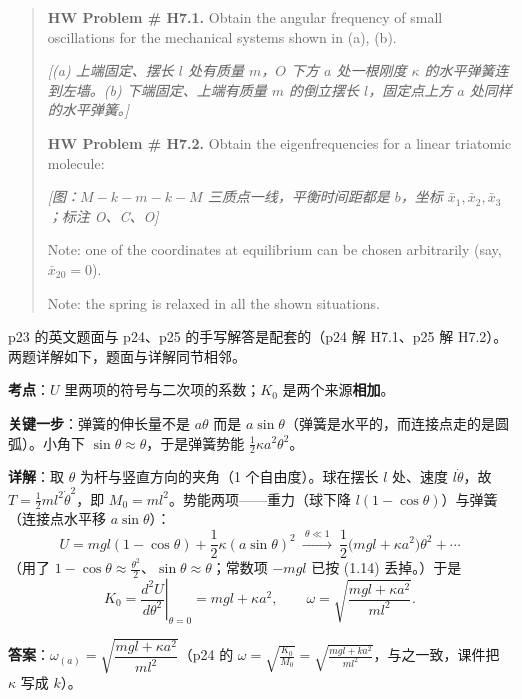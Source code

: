 \documentclass[11pt]{ctexart}
\begin{document}


\begin{quote}
\small
\textbf{HW Problem \# H7.1.} Obtain the angular frequency of small oscillations for the mechanical systems shown in (a), (b).

\emph{[(a) 上端固定、摆长 $l$ 处有质量 $m$，$O$ 下方 $a$ 处一根刚度 $\kappa$ 的水平弹簧连到左墙。(b) 下端固定、上端有质量 $m$ 的倒立摆长 $l$，固定点上方 $a$ 处同样的水平弹簧。]}

\textbf{HW Problem \# H7.2.} Obtain the eigenfrequencies for a linear triatomic molecule:

\emph{[图：$M\!-\!k\!-\!m\!-\!k\!-\!M$ 三质点一线，平衡时间距都是 $b$，坐标 $\bar x_1,\bar x_2,\bar x_3$；标注 O、C、O]}

Note: one of the coordinates at equilibrium can be chosen arbitrarily (say, $\bar x_{20}=0$).

Note: the spring is relaxed in all the shown situations.
\end{quote}

p23 的英文题面与 p24、p25 的手写解答是配套的（p24 解 H7.1、p25 解 H7.2）。两题详解如下，题面与详解同节相邻。


\textbf{考点}：$U$ 里两项的符号与二次项的系数；$K_0$ 是两个来源\textbf{相加}。

\textbf{关键一步}：弹簧的伸长量不是 $a\theta$ 而是 $a\sin\theta$（弹簧是水平的，而连接点走的是圆弧）。小角下 $\sin\theta\approx\theta$，于是弹簧势能 $\frac12\kappa a^2\theta^2$。

\textbf{详解}：取 $\theta$ 为杆与竖直方向的夹角（1 个自由度）。球在摆长 $l$ 处、速度 $l\dot\theta$，故 $T=\frac12ml^2\dot\theta^2$，即 $M_0=ml^2$。势能两项——重力（球下降 $l(1-\cos\theta)$）与弹簧（连接点水平移 $a\sin\theta$）：
\[
U=mgl(1-\cos\theta)+\frac12\kappa(a\sin\theta)^2
\ \xrightarrow{\ \theta\ll1\ }\
\frac12\bigl(mgl+\kappa a^2\bigr)\theta^2+\cdots
\]
（用了 $1-\cos\theta\approx\frac{\theta^2}{2}$、$\sin\theta\approx\theta$；常数项 $-mgl$ 已按 (1.14) 丢掉。）于是
\[
K_0=\left.\frac{d^2U}{d\theta^2}\right|_{\theta=0}=mgl+\kappa a^2,\qquad
\omega=\sqrt{\frac{mgl+\kappa a^2}{ml^2}} .
\]

\textbf{答案}：$\omega_{(a)}=\sqrt{\dfrac{mgl+\kappa a^2}{ml^2}}$（p24 的 $\omega=\sqrt{\frac{K_0}{M_0}}=\sqrt{\frac{mgl+ka^2}{ml^2}}$，与之一致，课件把 $\kappa$ 写成 $k$）。
\end{document}
